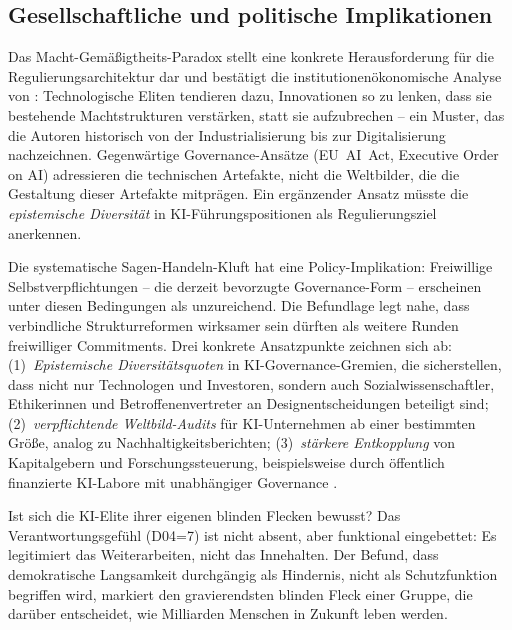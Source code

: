 \documentclass[12pt,a4paper]{article}
\begin{document}
\subsection{Gesellschaftliche und politische Implikationen}
\label{sec:diskussion:implikationen}

Das Macht-Gem\"a\ss{}igtheits-Paradox stellt eine konkrete Herausforderung f\"ur die Regulierungsarchitektur dar und best\"atigt die institutionen\"okonomische Analyse von \citet{AcemogluJohnson2023}: Technologische Eliten tendieren dazu, Innovationen so zu lenken, dass sie bestehende Machtstrukturen verst\"arken, statt sie aufzubrechen -- ein Muster, das die Autoren historisch von der Industrialisierung bis zur Digitalisierung nachzeichnen. Gegenw\"artige Governance-Ans\"atze (EU~AI~Act, Executive Order on AI) adressieren die technischen Artefakte, nicht die Weltbilder, die die Gestaltung dieser Artefakte mitpr\"agen. Ein erg\"anzender Ansatz m\"usste die \emph{epistemische Diversit\"at} in KI-F\"uhrungspositionen als Regulierungsziel anerkennen.

Die systematische Sagen-Handeln-Kluft hat eine Policy-Implikation: Freiwillige Selbstverpflichtungen -- die derzeit bevorzugte Governance-Form \citep[vgl.][]{Bengio2024} -- erscheinen unter diesen Bedingungen als unzureichend. Die Befundlage legt nahe, dass verbindliche Strukturreformen wirksamer sein d\"urften als weitere Runden freiwilliger Commitments. Drei konkrete Ansatzpunkte zeichnen sich ab: (1)~\emph{Epistemische Diversit\"atsquoten} in KI-Governance-Gremien, die sicherstellen, dass nicht nur Technologen und Investoren, sondern auch Sozialwissenschaftler, Ethikerinnen und Betroffenenvertreter an Designentscheidungen beteiligt sind; (2)~\emph{verpflichtende Weltbild-Audits} f\"ur KI-Unternehmen ab einer bestimmten Gr\"o\ss{}e, analog zu Nachhaltigkeitsberichten; (3)~\emph{st\"arkere Entkopplung} von Kapitalgebern und Forschungssteuerung, beispielsweise durch \"offentlich finanzierte KI-Labore mit unabh\"angiger Governance \citep[vgl.][]{AcemogluJohnson2023}.

Ist sich die KI-Elite ihrer eigenen blinden Flecken bewusst? Das Verantwortungsgef\"uhl (D04=7) ist nicht absent, aber funktional eingebettet: Es legitimiert das Weiterarbeiten, nicht das Innehalten. Der Befund, dass demokratische Langsamkeit durchg\"angig als Hindernis, nicht als Schutzfunktion begriffen wird, markiert den gravierendsten blinden Fleck einer Gruppe, die dar\"uber entscheidet, wie Milliarden Menschen in Zukunft leben werden.
\end{document}
